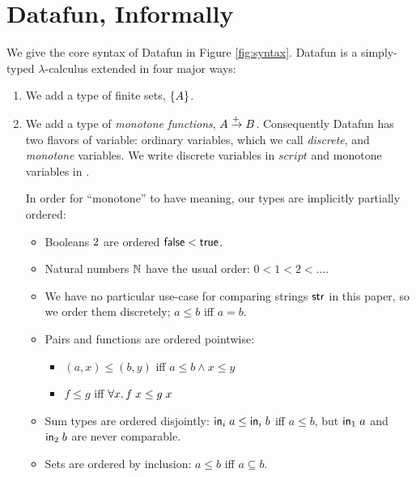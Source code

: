 
\section{Datafun, Informally}
\label{sec:informally}

We give the core syntax of Datafun in Figure \ref{fig:syntax}. Datafun is a
simply-typed $\lambda$-calculus extended in four major ways:

\begin{enumerate}
\item We add a type of finite sets, $\{A\}$.



\item We add a type of \emph{monotone functions}, $A \overset{+\:}{\to} B$. Consequently
  Datafun has two flavors of variable: ordinary variables, which we call
  \emph{discrete}, and \emph{monotone} variables. We write discrete variables in
  $script$ and monotone variables in .

  In order for ``monotone'' to have meaning, our types are implicitly partially
  ordered:
  \begin{itemize}
  \item Booleans $2$ are ordered $\mathsf{false} < \mathsf{true}$.
  \item Natural numbers $\mathbb{N}$ have the usual order: $0 < 1 < 2 < ...$.
  \item We have no particular use-case for comparing strings $\mathsf{str}$ in
    this paper, so we order them discretely; $a \le b$ iff $a = b$.
  \item Pairs and functions are ordered pointwise:
    \begin{itemize}
    \item $(a, x) \le (b, y)$ iff $a \le b \wedge x \le y$
    \item $f \le g$ iff $\forall x.\, f\;x \le g\;x$
    \end{itemize}
  \item Sum types are ordered disjointly: $\mathsf{in}_i\; a \le
    \mathsf{in}_i\; b$ iff $a \le b$, but $\mathsf{in}_1\; a$ and $\mathsf{in}_2\; b$ are
    never comparable.
  \item Sets are ordered by inclusion: $a \le b$ iff $a \subseteq b$.
  \end{itemize}


\end{enumerate}
